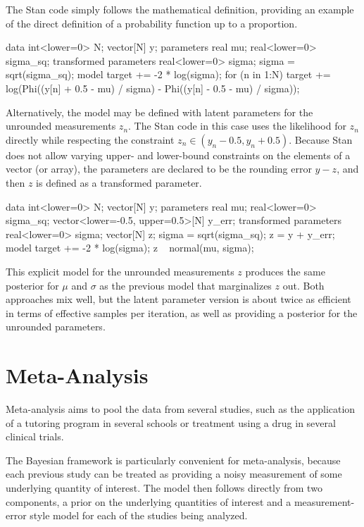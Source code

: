The Stan code simply follows the mathematical definition, providing an
example of the direct definition of a probability function up to a
proportion.
%
\begin{stancode}
data {
  int<lower=0> N;
  vector[N] y;
}
parameters {
  real mu;
  real<lower=0> sigma_sq;
}
transformed parameters {
  real<lower=0> sigma;
  sigma = sqrt(sigma_sq);
}
model {
  target += -2 * log(sigma);
  for (n in 1:N)
    target += log(Phi((y[n] + 0.5 - mu) / sigma)
                  - Phi((y[n] - 0.5 - mu) / sigma));
}
\end{stancode}

Alternatively, the model may be defined with latent parameters for the
unrounded measurements $z_n$.  The Stan code in this case uses the
likelihood for $z_n$ directly while respecting the constraint $z_n \in
(y_n - 0.5, y_n + 0.5)$.  Because Stan does not allow varying upper-
and lower-bound constraints on the elements of a vector (or array),
the parameters are declared to be the rounding error $y - z$, and
then $z$ is defined as a transformed parameter.
%
\begin{stancode}
data {
  int<lower=0> N;
  vector[N] y;
}
parameters {
  real mu;
  real<lower=0> sigma_sq;
  vector<lower=-0.5, upper=0.5>[N] y_err;
}
transformed parameters {
  real<lower=0> sigma;
  vector[N] z;
  sigma = sqrt(sigma_sq);
  z = y + y_err;
}
model {
  target += -2 * log(sigma);
  z ~ normal(mu, sigma);
}
\end{stancode}
%
This explicit model for the unrounded measurements $z$ produces the
same posterior for $\mu$ and $\sigma$ as the previous model that
marginalizes $z$ out.  Both approaches mix well, but the latent
parameter version is about twice as efficient in terms of effective
samples per iteration, as well as providing a posterior for the
unrounded parameters.


\section{Meta-Analysis}

Meta-analysis aims to pool the data from several studies, such as the
application of a tutoring program in several schools or treatment
using a drug in several clinical trials.  

The Bayesian framework is particularly convenient for meta-analysis,
because each previous study can be treated as providing a noisy
measurement of some underlying quantity of interest.  The model then
follows directly from two components, a prior on the underlying
quantities of interest and a measurement-error style model for each of
the studies being analyzed.

